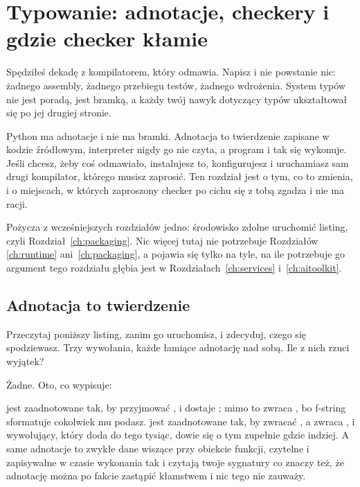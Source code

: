 
\chapter{Typowanie: adnotacje, checkery i gdzie checker kłamie}
\label{ch:typing}

\noindent
Spędziłeś dekadę z kompilatorem, który odmawia. Napisz  i nie powstanie nic: żadnego assembly, żadnego przebiegu testów,
żadnego wdrożenia. System typów nie jest poradą, jest bramką, a każdy twój
nawyk dotyczący typów ukształtował się po jej drugiej stronie.

Python ma adnotacje i nie ma bramki. Adnotacja to twierdzenie zapisane w
kodzie źródłowym, interpreter nigdy go nie czyta, a program i tak się
wykonuje. Jeśli chcesz, żeby coś odmawiało, instalujesz to, konfigurujesz i
uruchamiasz sam \dash{} drugi kompilator, którego musisz zaprosić. Ten
rozdział jest o tym, co to zmienia, i o miejscach, w których zaproszony
checker po cichu się z tobą zgadza i nie ma racji.

Pożycza z wcześniejszych rozdziałów jedno: środowisko zdolne uruchomić
listing, czyli Rozdział~\ref{ch:packaging}. Nic więcej tutaj nie potrzebuje
Rozdziałów \ref{ch:runtime} ani~\ref{ch:packaging}, a 
pojawia się tylko na tyle, na ile potrzebuje go argument tego rozdziału
\dash{} głębia jest w Rozdziałach~\ref{ch:services}
i~\ref{ch:aitoolkit}.

\section{Adnotacja to twierdzenie}
\label{sec:ch03-claim}

Przeczytaj poniższy listing, zanim go uruchomisz, i zdecyduj, czego się
spodziewasz. Trzy wywołania, każde łamiące adnotację nad sobą. Ile z nich
rzuci wyjątek?


\noindent
Żadne. Oto, co wypisuje:


\noindent
{} jest zaadnotowane tak, by przyjmować , i dostaje
; mimo to zwraca , bo f-string sformatuje cokolwiek mu
podasz.  jest zaadnotowane tak, by zwracać , a
zwraca , i wywołujący, który doda do tego tysiąc, dowie się o tym
zupełnie gdzie indziej. A same adnotacje to zwykłe dane wiszące przy
obiekcie funkcji, czytelne i zapisywalne w czasie wykonania \dash{} tak
 i  czytają twoje sygnatury \dash{} co znaczy
też, że adnotację można po fakcie zastąpić kłamstwem i nic tego nie
zauważy.

